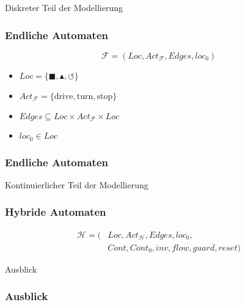 \documentclass[ngerman]{beamer}
\begin{document}
\begin{section}{Diskreter Teil der Modellierung}

\begin{frame}
    \frametitle{Endliche Automaten}

    $$\mathcal{F} = ( \mathit{Loc}, \mathit{Act}_{\mathcal{F}}, \mathit{Edges}, \mathit{loc}_0 ) $$

    \begin{itemize}
        \item $\mathit{Loc} = \{ \blacksquare, \blacktriangle, \circlearrowleft \} $
        \item $\mathit{Act}_{\mathcal{F}} = \{ \text{drive}, \text{turn}, \text{stop} \} $
        \item $\mathit{Edges} \subseteq \mathit{Loc} \times \mathit{Act}_{\mathcal{F}} \times \mathit{Loc} $
        \item $\mathit{loc}_0 \in \mathit{Loc} $
    \end{itemize}
\end{frame}

\begin{frame}
    \frametitle{Endliche Automaten}
    \begin{figure}
        \centering
    \end{figure}

\end{frame}

\end{section}
\begin{section}{Kontinuierlicher Teil der Modellierung}

\begin{frame}
    \frametitle{Hybride Automaten}

    \begin{align*}
        \mathcal{H} = ( & \mathit{Loc}, \mathit{Act}_{\mathcal{H}}, \mathit{Edges}, \mathit{loc}_0, \\
                        & \mathit{Cont}, \mathit{Cont}_0, \mathit{inv}, \mathit{flow}, \mathit{guard}, \mathit{reset} )
    \end{align*}
\end{frame}

\end{section}
\begin{section}{Ausblick}

\begin{frame}
    \frametitle{Ausblick}
\end{frame}

\end{section}
\end{document}
